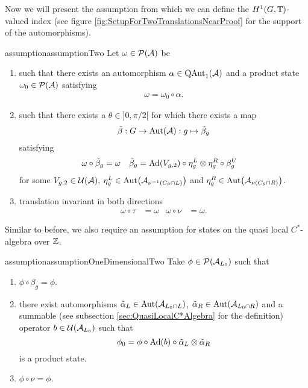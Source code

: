 \documentclass[11pt,a4paper,twoside]{article}
\numberwithin{equation}{section}
\begin{document}

Now we will present the assumption from which we can define the $H^1(G,\mathbb T)$-valued index (see figure \ref{fig:SetupForTwoTranslationsNearProof} for the support of the automorphisms).
\begin{restatable}{assumption}{assumptionTwo}\label{assumption:2Translations}
	Let $\omega\in\mathcal P(\mathcal A)$ be
	\begin{enumerate}
		\item such that there exists an automorphism $\alpha\in\QAut{\AA}$ and a product state $\omega_0\in\mathcal P(\mathcal A)$ satisfying
		\begin{align}
			\omega=\omega_0\circ\alpha.
		\end{align}
		\item such that there exists a $\theta\in]0,\pi/2[$ for which there exists a map
		\begin{equation}
			\tilde\beta:G\rightarrow\Aut{\AA}:g\mapsto\tilde\beta_g
		\end{equation}
		satisfying
		\begin{align}
			\label{eq:2TranslationsCondition3part1}
			\omega\circ\tilde\beta_g&=\omega&\tilde\beta_g&=\Ad{V_{g,2}}\circ\eta^L_g\otimes\eta^R_g\circ\beta^U_g
		\end{align}
		for some $V_{g,2}\in\mathcal U(\mathcal A),$ $\eta^L_g\in\Aut{\AA_{\nu^{-1}(C_\theta\cap L)}}$ and  $\eta^R_g\in\Aut{\AA_{\nu(C_\theta\cap R)}}$.
		\item translation invariant in both directions
		\begin{align}
			\omega\circ\tau&=\omega&\omega\circ\nu&=\omega.
		\end{align}
	\end{enumerate}
\end{restatable}
Similar to before, we also require an assumption for states on the quasi local $C^*$-algebra over $\mathbb Z$.
\begin{restatable}{assumption}{assumptionOneDimensionalTwo}\label{assumption1dWithTranslation}
	Take $\phi\in\mathcal P(\mathcal A_{L_0})$ such that
	\begin{enumerate}
		\item $\phi\circ\beta_g=\phi$.
		\item there exist automorphisms $\tilde\alpha_L\in\Aut{\AA_{L_0\cap L}}$, $\tilde\alpha_R\in\Aut{\AA_{L_0\cap R}}$ and a summable (see subsection \ref{sec:QuasiLocalC*Algebra} for the definition) operator $b\in\mathcal U(\mathcal A_{L_0})$ such that
		\begin{equation}
			\phi_0=\phi\circ\Ad{b}\circ\tilde\alpha_L\otimes\tilde\alpha_R
		\end{equation}
		is a product state.
		\item $\phi\circ\nu=\phi$.
	\end{enumerate}
\end{restatable}
\end{document}
